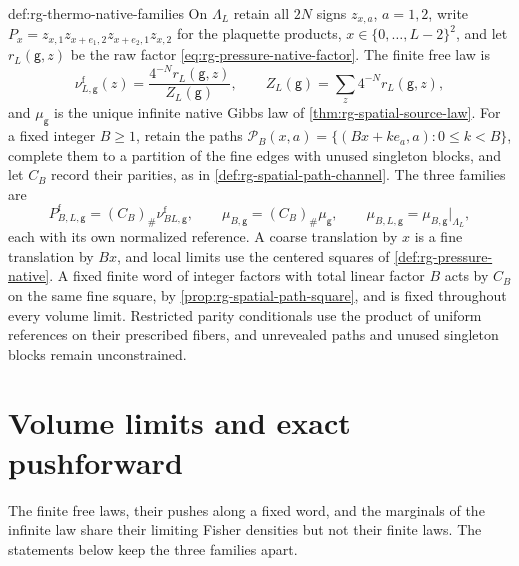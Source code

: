 {def:rg-thermo-native-families}
On $\Lambda_L$ retain all $2N$ signs $z_{x,a}$, $a=1,2$, write
$P_x=z_{x,1}z_{x+e_1,2}z_{x+e_2,1}z_{x,2}$ for the plaquette products,
$x\in\{0,\ldots,L-2\}^2$, and let $r_L(\mathsf g,z)$ be the raw factor
\cref{eq:rg-pressure-native-factor}. The finite free law is
\begin{equation}
 \nu^{\mathrm f}_{L,\mathsf g}(z)=\frac{4^{-N}r_L(\mathsf g,z)}{Z_L(\mathsf g)},
 \qquad Z_L(\mathsf g)=\sum_z4^{-N}r_L(\mathsf g,z),
 \label{eq:rg-thermo-native-free-factor}
\end{equation}
and $\mu_{\mathsf g}$ is the unique infinite native Gibbs law of
\cref{thm:rg-spatial-source-law}. For a fixed integer $B\geq1$, retain the
paths $\mathcal P_B(x,a)=\{(Bx+ke_a,a):0\leq k<B\}$, complete them to a
partition of the fine edges with unused singleton blocks, and let $C_B$
record their parities, as in \cref{def:rg-spatial-path-channel}. The three
families are
\begin{equation}
 P^{\mathrm f}_{B,L,\mathsf g}=(C_B)_\#\nu^{\mathrm f}_{BL,\mathsf g},\qquad
 \mu_{B,\mathsf g}=(C_B)_\#\mu_{\mathsf g},\qquad
 \mu_{B,L,\mathsf g}=\mu_{B,\mathsf g}|_{\Lambda_L},
 \label{eq:rg-thermo-native-three-families}
\end{equation}
each with its own normalized reference. A coarse translation by $x$ is a fine
translation by $Bx$, and local limits use the centered squares of
\cref{def:rg-pressure-native}. A fixed finite word of integer factors with
total linear factor $B$ acts by $C_B$ on the same fine square, by
\cref{prop:rg-spatial-path-square}, and is fixed throughout every volume
limit. Restricted parity conditionals use the product of uniform references
on their prescribed fibers, and unrevealed paths and unused singleton blocks
remain unconstrained.

\section{Volume limits and exact pushforward}
\label{sec:rg-thermo-draft-limit-organization}

The finite free laws, their pushes along a fixed word, and the marginals of
the infinite law share their limiting Fisher densities but not their finite
laws. The statements below keep the three families apart.

